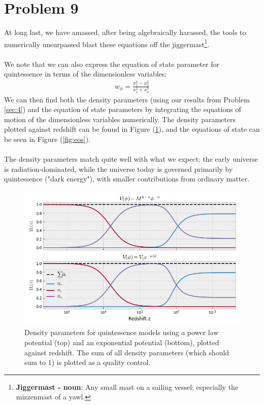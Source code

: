 \documentclass[reprint,english,notitlepage,nofootinbib]{revtex4-1}  %
\numberwithin{equation}{section}
\begin{document}
\section{Problem 9}
At long last, we have amassed, after being algebraically harassed, the tools to
numerically unsurpassed blast these equations off the
jiggermast\footnote{\textbf{Jiggermast - noun}: Any small mast on a sailing vessel;
especially the mizzenmast of a yawl.}.
\\ \\
We note that we can also express the equation of state parameter for
quintessence in terms of the dimensionless variables:
\begin{align}
		w_\phi = \frac{x_1^2 - x_2^2}{x_1^2 + x_2^2}
\end{align}
We can then find both the density parameters (using our results from Problem
\ref{sec:4}) and the equation of state parameters by
integrating the equations of motion of the dimensionless variables numerically.
The density parameters plotted against redshift can be found in Figure
(\ref{fig:omegas}), and the equations of state can be seen in Figure (\ref{fig:eos}).
\\ \\
The density parameters match quite well with what we expect; the early universe
is radiation-dominated, while the universe today is governed primarily by
quintessence ("dark energy"), with smaller contributions from ordinary matter.
\\
\begin{figure}[h!]
	\includegraphics[scale=0.4]{density_parameters.png}
	\caption{Density parameters for quintessence models using a power law potential
	(top) and an exponential potential (bottom), plotted against redshift. The sum
	of all density parameters (which should sum to $1$) is plotted as a quality
	control.}
	\label{fig:omegas}
\end{figure}
\end{document}
